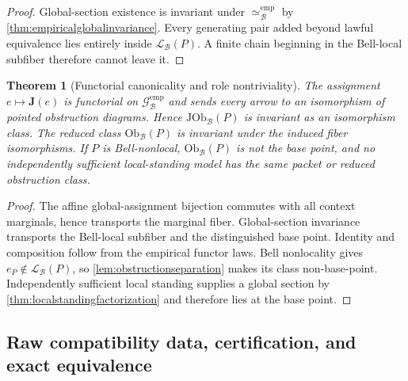 \documentclass[11pt]{article}
\newtheorem{theorem}{Theorem}[section]
\theoremstyle{definition}
\newcommand{\Bell}{\mathcal{B}}
\newcommand{\EmpLaw}{\mathscr{G}^{\mathrm{emp}}_{\Bell}}
\newcommand{\EmpEq}{\simeq^{\mathrm{emp}}_{\Bell}}
\newcommand{\BellLocal}{\mathcal L_{\Bell}}
\newcommand{\JOb}{\mathrm{JOb}_{\Bell}}
\newcommand{\ObBell}{\mathrm{Ob}_{\Bell}}
\begin{document}
\begin{proof}
Global-section existence is invariant under $\EmpEq$ by \cref{thm:empiricalglobalinvariance}. Every generating pair added beyond lawful equivalence lies entirely inside $\BellLocal(P)$. A finite chain beginning in the Bell-local subfiber therefore cannot leave it.
\end{proof}

\begin{theorem}[Functorial canonicality and role nontriviality]\label{thm:jointinvariantcanonical}
The assignment $e\mapsto\mathbf J(e)$ is functorial on $\EmpLaw$ and sends every arrow to an isomorphism of pointed obstruction diagrams. Hence $\JOb(P)$ is invariant as an isomorphism class. The reduced class $\ObBell(P)$ is invariant under the induced fiber isomorphisms. If $P$ is Bell-nonlocal, $\ObBell(P)$ is not the base point, and no independently sufficient local-standing model has the same packet or reduced obstruction class.
\end{theorem}

\begin{proof}
The affine global-assignment bijection commutes with all context marginals, hence transports the marginal fiber. Global-section invariance transports the Bell-local subfiber and the distinguished base point. Identity and composition follow from the empirical functor laws. Bell nonlocality gives $e_P\notin\BellLocal(P)$, so \cref{lem:obstructionseparation} makes its class non-base-point. Independently sufficient local standing supplies a global section by \cref{thm:localstandingfactorization} and therefore lies at the base point.
\end{proof}

\subsection{Raw compatibility data, certification, and exact equivalence}
\end{document}
